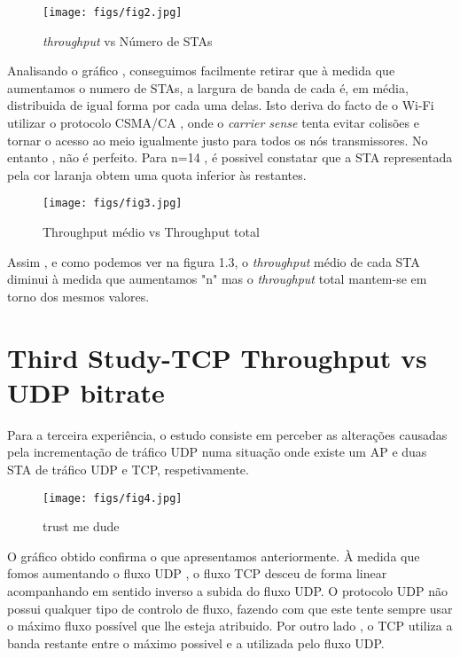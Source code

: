 \begin{figure}[H]
    \centering
    \texttt{[image: figs/fig2.jpg]}
    \caption{\textit{throughput} vs Número de STAs}
    \label{fig:2}
\end{figure}

Analisando o gráfico , conseguimos facilmente retirar que à medida que aumentamos o numero de STAs, a largura de banda de cada é, em média,
distribuida de igual forma por cada uma delas. Isto deriva do facto de o Wi-Fi utilizar o protocolo CSMA/CA , onde o \textit{carrier sense} tenta 
evitar colisões e tornar o acesso ao meio igualmente justo para todos os nós transmissores. No entanto , não é perfeito. Para n=14 , é possivel constatar
que a STA representada pela cor laranja obtem uma quota inferior às restantes.

\begin{figure}[H]
    \centering
    \texttt{[image: figs/fig3.jpg]}
    \caption{Throughput médio vs Throughput total}
    \label{fig:3}
\end{figure}
Assim , e como podemos ver na figura 1.3, o \textit{throughput} médio de cada STA diminui à medida que aumentamos "n" mas o \textit{throughput} total mantem-se 
em torno dos mesmos valores.






\section{Third Study-TCP Throughput vs UDP bitrate} \label{ex3}
    Para a terceira experiência, o estudo consiste em perceber as alterações causadas pela incrementação de tráfico UDP numa 
situação onde existe um AP e duas STA de tráfico UDP e TCP, respetivamente.


\begin{figure}[H]
    \centering
    \texttt{[image: figs/fig4.jpg]}
    \caption{trust me dude}
    \label{fig:4}
\end{figure}

O gráfico obtido confirma o que apresentamos anteriormente. À medida que fomos aumentando o fluxo UDP , o fluxo TCP desceu
de forma linear acompanhando em sentido inverso a subida do fluxo UDP.
O protocolo UDP não possui qualquer tipo de controlo de fluxo, fazendo com que este tente sempre usar o máximo fluxo possível que lhe esteja atribuido.
Por outro lado , o TCP utiliza a banda restante entre o máximo possivel e a utilizada pelo fluxo UDP.

